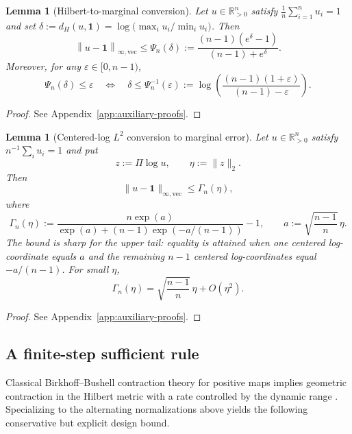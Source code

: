 \documentclass[11pt]{article}
\numberwithin{equation}{section}
\theoremstyle{plain}
\newtheorem{lemma}[theorem]{Lemma}
\theoremstyle{definition}
\theoremstyle{remark}
\newcommand{\R}{\mathbb{R}}
\newcommand{\ones}{\mathbf{1}}
\newcommand{\norm}[1]{\left\lVert #1 \right\rVert}
\begin{document}
\begin{lemma}[Hilbert-to-marginal conversion]\label{lem:Psi}
Let $u\in\R^n_{>0}$ satisfy $\frac{1}{n}\sum_{i=1}^n u_i=1$ and set
$\delta:=d_H(u,\ones)=\log\!\big(\max_i u_i/\min_i u_i\big)$. Then
\begin{equation}\label{eq:Psi}
\norm{u-\ones}_{\infty,\mathrm{vec}} \le \Psi_n(\delta)
:=\frac{(n-1)(e^\delta-1)}{(n-1)+e^\delta}.
\end{equation}
Moreover, for any $\varepsilon\in[0,n-1)$,
\begin{equation}\label{eq:Psi-inv}
\Psi_n(\delta)\le \varepsilon
\quad\Longleftrightarrow\quad
\delta\le \Psi_n^{-1}(\varepsilon)
:=\log\!\left(\frac{(n-1)(1+\varepsilon)}{(n-1)-\varepsilon}\right).
\end{equation}
\end{lemma}

\begin{proof}
See Appendix~\ref{app:auxiliary-proofs}.
\end{proof}



\begin{lemma}[Centered-log $L^2$ conversion to marginal error]\label{lem:Gamma}
Let $u\in\R^n_{>0}$ satisfy $n^{-1}\sum_i u_i=1$ and put
\[
        z:=\Pi\log u,
        \qquad
        \eta:=\|z\|_2.
\]
Then
\begin{equation}\label{eq:Gamma-bound}
        \|u-\ones\|_{\infty,\mathrm{vec}}
        \le
        \Gamma_n(\eta),
\end{equation}
where
\begin{equation}\label{eq:Gamma-def}
        \Gamma_n(\eta)
        :=
        \frac{n\exp(a)}{\exp(a)+(n-1)\exp\!\left(-a/(n-1)\right)}-1,
        \qquad
        a:=\sqrt{\frac{n-1}{n}}\,\eta .
\end{equation}
The bound is sharp for the upper tail: equality is attained when one centered log-coordinate equals
$a$ and the remaining $n-1$ centered log-coordinates equal $-a/(n-1)$. For small $\eta$,
\begin{equation}\label{eq:Gamma-small}
        \Gamma_n(\eta)
        =
        \sqrt{\frac{n-1}{n}}\,\eta+O(\eta^2).
\end{equation}
\end{lemma}

\begin{proof}
See Appendix~\ref{app:auxiliary-proofs}.
\end{proof}


\subsection{A finite-step sufficient rule}\label{subsec:tmax-rule}
Classical Birkhoff--Bushell contraction theory for positive maps implies geometric contraction in the Hilbert metric with a
rate controlled by the dynamic range \citep{Birkhoff1957,Bushell1973}. Specializing to the alternating normalizations above yields the following conservative but explicit design bound.
\end{document}
